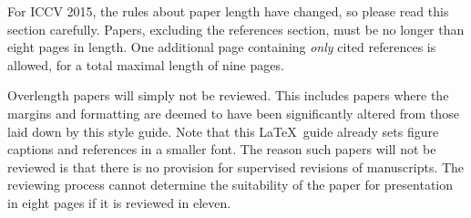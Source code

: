 For ICCV 2015, the rules about paper length have changed, so please
read this section carefully. Papers, excluding the references section,
must be no longer than eight pages in length. One additional page
containing {\em only} cited references is allowed, for a total maximal
length of nine pages.


Overlength papers will simply not be reviewed.  This includes papers
where the margins and formatting are deemed to have been significantly
altered from those laid down by this style guide.  Note that this
\LaTeX\ guide already sets figure captions and references in a smaller font.
The reason such papers will not be reviewed is that there is no provision for
supervised revisions of manuscripts.  The reviewing process cannot determine
the suitability of the paper for presentation in eight pages if it is
reviewed in eleven.